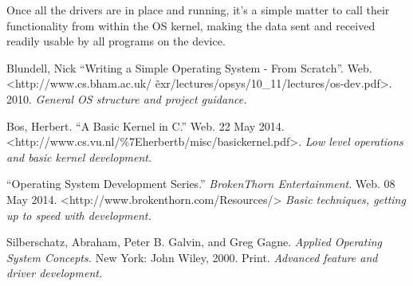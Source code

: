 \documentclass[english]{paper}
\begin{document}
Once all the drivers are in place and running, it's a simple matter to call their functionality from within the OS kernel, making the data sent and received readily usable by all programs on the device.

\newpage

\begin{thebibliography}{1}

 Blundell, Nick ``Writing a Simple Operating System - From Scratch''. Web. <http://www.cs.bham.ac.uk/ \~ exr/lectures/opsys/10\_11/lectures/os-dev.pdf>. 2010. {\it General OS structure and project guidance.}

  Bos, Herbert. ``A Basic Kernel in C.'' Web. 22 May 2014. <http://www.cs.vu.nl/\%7Eherbertb/misc/basickernel.pdf>. {\it Low level operations and basic kernel development.}

 ``Operating System Development Series.'' {\em BrokenThorn Entertainment}. Web. 08 May 2014. <http://www.brokenthorn.com/Resources/> {\it Basic techniques, getting up to speed with development.}

 Silberschatz, Abraham, Peter B. Galvin, and Greg Gagne. \textit{Applied Operating System Concepts.} New York: John Wiley, 2000. Print. {\it Advanced feature and driver development.}

\end{thebibliography}
\end{document}
